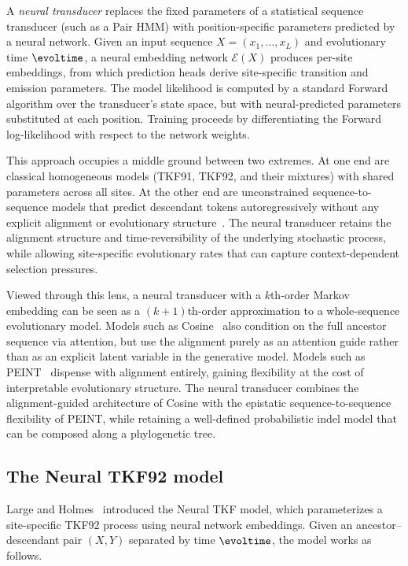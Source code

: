 A \emph{neural transducer} replaces the fixed parameters of a statistical sequence transducer
(such as a Pair HMM) with position-specific parameters predicted by a neural network.
Given an input sequence $X = (x_1, \ldots, x_L)$ and evolutionary time $\evoltime$,
a neural embedding network $\mathcal{E}(X)$ produces per-site embeddings,
from which prediction heads derive site-specific transition and emission parameters.
The model likelihood is computed by a standard Forward algorithm
over the transducer's state space,
but with neural-predicted parameters substituted at each position.
Training proceeds by differentiating the Forward log-likelihood with respect to the network weights.

This approach occupies a middle ground between two extremes.
At one end are classical homogeneous models (TKF91, TKF92, and their mixtures)
with shared parameters across all sites.
At the other end are unconstrained sequence-to-sequence models
that predict descendant tokens autoregressively
without any explicit alignment or evolutionary structure~\cite{KoehlEtAl2026PEINT}.
The neural transducer retains the alignment structure and time-reversibility
of the underlying stochastic process,
while allowing site-specific evolutionary rates
that can capture context-dependent selection pressures.

Viewed through this lens,
a neural transducer with a $k$th-order Markov embedding
can be seen as a $(k+1)$th-order approximation
to a whole-sequence evolutionary model.
Models such as Cosine~\cite{LuEtAl2026Cosine}
also condition on the full ancestor sequence via attention,
but use the alignment purely as an attention guide
rather than as an explicit latent variable in the generative model.
Models such as PEINT~\cite{KoehlEtAl2026PEINT}
dispense with alignment entirely,
gaining flexibility at the cost of interpretable evolutionary structure.
The neural transducer combines the alignment-guided architecture
of Cosine with the epistatic sequence-to-sequence flexibility of PEINT,
while retaining a well-defined probabilistic indel model
that can be composed along a phylogenetic tree.

\subsection{The Neural TKF92 model}

Large and Holmes~\cite{LargeHolmes2026} introduced the Neural TKF model,
which parameterizes a site-specific TKF92 process using neural network embeddings.
Given an ancestor--descendant pair $(X, Y)$ separated by time $\evoltime$,
the model works as follows.

